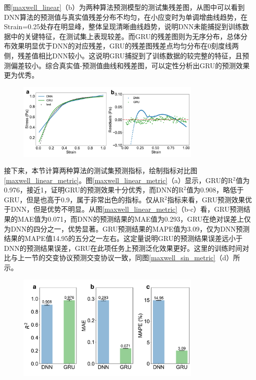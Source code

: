 图\ref{maxwell_linear}（b）为两种算法预测模型的测试集残差图，从图中可以看到DNN算法的预测值与真实值残差分布不均匀，在小应变时为单调增曲线趋势，在Strain=0.25处存在明显峰，整体呈现清晰曲线趋势，说明DNN未能捕捉到训练数据中的关键特征，在测试集上表现较差。而GRU的残差图则为无序分布，总体分布效果明显优于DNN的对应残差，GRU的残差图残差点均匀分布在0刻度线两侧，残差值相比DNN较小。这说明GRU捕捉到了训练数据的较完整的特征，且预测偏差较小。综合真实值-预测值曲线和残差图，可以定性分析出GRU的预测效果更为优秀。
\begin{figure}[htbp]
  \centering
  \includegraphics[width=0.8\textwidth]{Fig/maxwell_linear_test.pdf}
  \FigureBicaption{\label{maxwell_linear}}{}
\end{figure}
接下来，本节计算两种算法的测试集预测指标，绘制指标对比图\ref{maxwell_linear_metric}。图\ref{maxwell_linear_metric}（a）显示，GRU的R$^2$值为0.976，接近1，证明GRU的预测效果十分优秀，而DNN的R$^2$值为0.908，略低于GRU，但是也高于0.9，属于非常出色的指标。仅从R$^2$指标来看，GRU预测效果优于DNN，但是优势不明显。从图\ref{maxwell_linear_metric}（b-c）看，GRU预测结果的MAE值为0.071，而DNN的预测结果的MAE值为0.293，GRU在绝对误差上仅为DNN的四分之一，优势显著。GRU预测结果的MAPE值为3.09，仅为DNN预测结果的MAPE值14.95的五分之一左右。这定量说明GRU的预测结果误差远小于DNN的预测结果误差，GRU在此项任务上预测泛化效果更好。这里的训练时间对比与上一节的交变协议预测交变协议一致，同图\ref{maxwell_sin_metric}（d）所示。
\begin{figure}[htbp]
  \centering
  \includegraphics[width=0.8\textwidth]{Fig/maxwell_linear_metric.pdf}
  \FigureBicaption{\label{maxwell_linear_metric}}{}
\end{figure}

